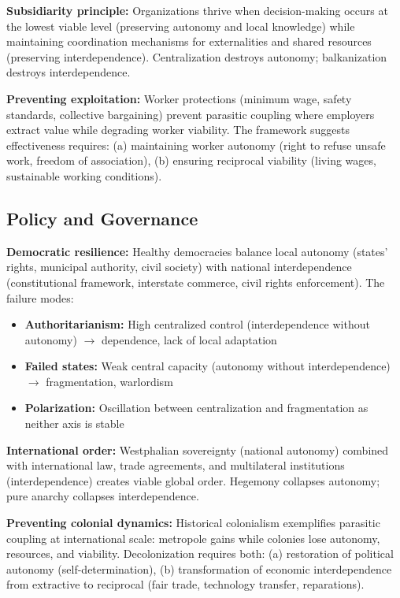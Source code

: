 \documentclass[11pt,a4paper]{article}
\begin{document}
\textbf{Subsidiarity principle:} Organizations thrive when decision-making occurs at the lowest viable level (preserving autonomy and local knowledge) while maintaining coordination mechanisms for externalities and shared resources (preserving interdependence). Centralization destroys autonomy; balkanization destroys interdependence.

\textbf{Preventing exploitation:} Worker protections (minimum wage, safety standards, collective bargaining) prevent parasitic coupling where employers extract value while degrading worker viability. The framework suggests effectiveness requires: (a) maintaining worker autonomy (right to refuse unsafe work, freedom of association), (b) ensuring reciprocal viability (living wages, sustainable working conditions).

\subsection{Policy and Governance}

\textbf{Democratic resilience:} Healthy democracies balance local autonomy (states' rights, municipal authority, civil society) with national interdependence (constitutional framework, interstate commerce, civil rights enforcement). The failure modes:
\begin{itemize}
    \item \textbf{Authoritarianism:} High centralized control (interdependence without autonomy) $\to$ dependence, lack of local adaptation
    \item \textbf{Failed states:} Weak central capacity (autonomy without interdependence) $\to$ fragmentation, warlordism
    \item \textbf{Polarization:} Oscillation between centralization and fragmentation as neither axis is stable
\end{itemize}

\textbf{International order:} Westphalian sovereignty (national autonomy) combined with international law, trade agreements, and multilateral institutions (interdependence) creates viable global order. Hegemony collapses autonomy; pure anarchy collapses interdependence.

\textbf{Preventing colonial dynamics:} Historical colonialism exemplifies parasitic coupling at international scale: metropole gains while colonies lose autonomy, resources, and viability. Decolonization requires both: (a) restoration of political autonomy (self-determination), (b) transformation of economic interdependence from extractive to reciprocal (fair trade, technology transfer, reparations).
\end{document}
